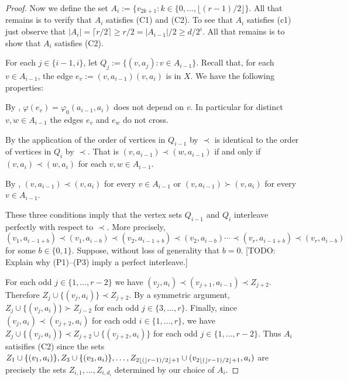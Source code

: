 \documentclass[kpfonts]{patmorin}
\begin{document}
\begin{proof}
    Now we define the set $A_i:=\{v_{2k+1}:k\in\{0,\ldots,\lfloor(r-1)/2\rfloor\}$.  All that remains is to verify that $A_i$ satisfies (C1) and (C2).  To see that $A_i$ satisfies (c1) just observe that $|A_i|=\lceil r/2\rceil \ge r/2= |A_{i-1}|/2\ge d/2^{i}$.  All that remains is to show that $A_i$ satisfies (C2).

    For each $j\in\{i-1,i\}$, let $Q_j:=\{(v,a_j):v\in A_{i-1}\}$.
    Recall that, for each $v\in A_{i-1}$, the edge $e_v:=(v,a_{i-1})(v,a_i)$ is in $X$.  We have the following properties:
    \begin{compactenum}[(P1)]
        \item By , $\varphi(e_v)=\varphi_0(a_{i-1},a_i)$ does not depend on $v$.  In particular for distinct $v,w\in A_{i-1}$ the edges $e_v$ and $e_w$ do not cross.
        \item By the application of  the order of vertices in $Q_{i-1}$ by $\prec$ is identical to the order of vertices in $Q_i$ by $\prec$.  That is $(v,a_{i-1})\prec (w,a_{i-1})$ if and only if $(v,a_{i})\prec (w,a_{i})$ for each $v,w\in A_{i-1}$.
        \item By , $(v,a_{i-1})\prec (v,a_i)$ for every $v\in A_{i-1}$ or $(v,a_{i-1})\succ (v,a_i)$ for every $v\in A_{i-1}$.
    \end{compactenum}
    These three conditions imply that the vertex sets $Q_{i-1}$ and $Q_{i}$ interleave perfectly with respect to $\prec$. More precisely,
    \[
        (v_1,a_{i-1+b})\prec (v_1,a_{i-b}) \prec (v_2,a_{i-1+b}) \prec (v_2,a_{i-b}) \cdots \prec (v_r,a_{i-1+b}) \prec (v_r,a_{i-b})
    \]
    for some $b\in\{0,1\}$.  Suppose, without loss of generality that $b=0$. [TODO: Explain why (P1)--(P3) imply a perfect interleave.]

    For each odd $j\in\{1,\ldots,r-2\}$ we have $(v_j,a_i)\prec (v_{j+1},a_{i-1}) \prec Z_{j+2}$.  Therefore $Z_j\cup\{(v_j,a_i)\} \prec Z_{j+2}$.  By a symmetric argument, $Z_j\cup\{(v_j,a_i)\} \succ Z_{j-2}$ for each odd $j\in\{3,\ldots,r\}$.  Finally, since $(v_{j},a_i)\prec (v_{j+2},a_i)$ for each odd $i\in\{1,\ldots,r\}$, we have $Z_{j}\cup\{(v_j,a_i)\} \prec Z_{j+2}\cup\{(v_{j+2},a_i)\}$ for each odd $j\in\{1,\ldots,r-2\}$.  Thus $A_i$ satisifies (C2) since the sets $Z_1\cup\{(v_1,a_i)\},Z_3\cup\{(v_3,a_i)\},\ldots,Z_{2{\lfloor ( \rfloor}r-1)/2\rfloor+1} \cup (v_{2{\lfloor ( \rfloor}r-1)/2\rfloor+1},a_i)$ are precisely the sets $Z_{i,1},\ldots,Z_{i,d_i}$ determined by our choice of $A_i$.
\end{proof}
\end{document}
